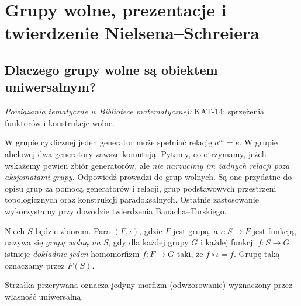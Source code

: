 \chapter[Grupy wolne i twierdzenie Nielsena--Schreiera]{Grupy wolne, prezentacje i twierdzenie Nielsena--Schreiera}
\label{aa:ch:grupy-wolne}

\providecommand{\atlasref}[2]{#2}


\section{Dlaczego grupy wolne są obiektem uniwersalnym?}

\noindent\emph{Powiązania tematyczne w Bibliotece matematycznej:} \atlasref{KAT-14::def:adjunction}{KAT-14: sprzężenia funktorów i konstrukcje wolne}.

W grupie cyklicznej jeden generator może spełniać relację $a^m=e$.
W grupie abelowej dwa generatory zawsze komutują. Pytamy, co otrzymamy,
jeżeli wskażemy pewien zbiór generatorów, ale \emph{nie narzucimy im żadnych
relacji poza aksjomatami grupy}. Odpowiedź prowadzi do grup wolnych.
Są one przydatne do opisu grup za pomocą generatorów i relacji, grup
podstawowych przestrzeni topologicznych oraz konstrukcji paradoksalnych.
Ostatnie zastosowanie wykorzystamy przy dowodzie twierdzenia
Banacha--Tarskiego.

\begin{definicja}
\label{aa:def:free-universal}
\label{def:grupa-wolna}
Niech $S$ będzie zbiorem. Para $(F,\iota)$, gdzie $F$ jest grupą,
a $\iota:S\to F$ jest funkcją, nazywa się \emph{grupą wolną na $S$},
gdy dla każdej grupy $G$ i każdej funkcji $f:S\to G$ istnieje
\emph{dokładnie jeden} homomorfizm $\widetilde f:F\to G$ taki, że
$\widetilde f\circ\iota=f$. Grupę taką oznaczamy przez $F(S)$.
\end{definicja}

Strzałka przerywana oznacza jedyny morfizm (odwzorowanie) wyznaczony przez własność uniwersalną.
\begin{center}
\end{center}


